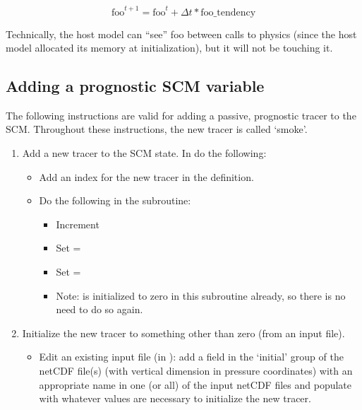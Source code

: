 \begin{equation}
\text{foo}^{t+1} = \text{foo}^t + \Delta t*\text{foo\_tendency}
\end{equation}

Technically, the host model can ``see'' foo between calls to physics (since the host model allocated its memory at initialization), but it will not be touching it.

\subsection{Adding a prognostic SCM variable}

The following instructions are valid for adding a passive, prognostic tracer to the SCM. Throughout these instructions, the new tracer is called `smoke'.

\begin{enumerate}
\item Add a new tracer to the SCM state. In  do the following:
	\begin{itemize}
	\item Add an index for the new tracer in the  definition.
	\item Do the following in the  subroutine:
		\begin{itemize}
		\item Increment 
		\item Set  = 
		\item Set  = 
		\item Note:  is initialized to zero in this subroutine already, so there is no need to do so again.
		\end{itemize}
	\end{itemize}
\item Initialize the new tracer to something other than zero (from an input file).
	\begin{itemize}
	\item Edit an existing input file (in ): add a field in the `initial' group of the netCDF file(s) (with vertical dimension in pressure coordinates) with an appropriate name in one (or all) of the input netCDF files and populate with whatever values are necessary to initialize the new tracer.

\end{itemize}
\end{enumerate}
